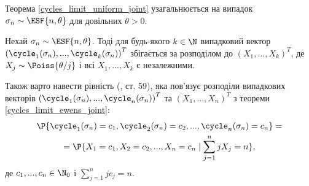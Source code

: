 Теорема \ref{cycles_limit_uniform_joint} узагальнюється на
випадок $\sigma_n \sim \ESF{n, \theta}$ для довільних $\theta > 0$.
\begin{theorem}\label{cycles_limit_ewens_joint}
    Нехай $\sigma_n \sim \ESF{n, \theta}$. Тоді
    для будь-якого $k \in \N$
    випадковий вектор 
    $\left(\cycle_{1}(\sigma_n), ..., \cycle_{k}(\sigma_n)\right)^T$
    збігається за розподілом до
    $\left(X_{1}, ..., X_{k}\right)^T$,
    де $X_{j} \sim \Poiss{\theta/{j}}$ і 
    всі $X_{1}, ..., X_{k}$ є незалежними.
\end{theorem}

Також варто навести рівність (\cite{LogStructures}, ст. 59), яка пов'язує
розподіли випадкових векторів $\left(\cycle_{1}(\sigma_n), ..., \cycle_{n}(\sigma_n)\right)^T$
та $\left(X_1, ..., X_n\right)^T$ з теореми \ref{cycles_limit_ewens_joint}:
\begin{gather}
    \P{
        \cycle_{1}(\sigma_n) = c_1, \cycle_{2}(\sigma_n) = c_2, ..., \cycle_{n}(\sigma_n) = c_n
    } = \\ =
    \P{
        X_1 = c_1, X_2 = c_2, ..., X_n = c_n \mid
        \sum_{j=1}^n j X_j = n
    },
\end{gather} 
де $c_1, ..., c_n \in \N_0$ і
$\sum_{j=1}^n j c_j = n$.